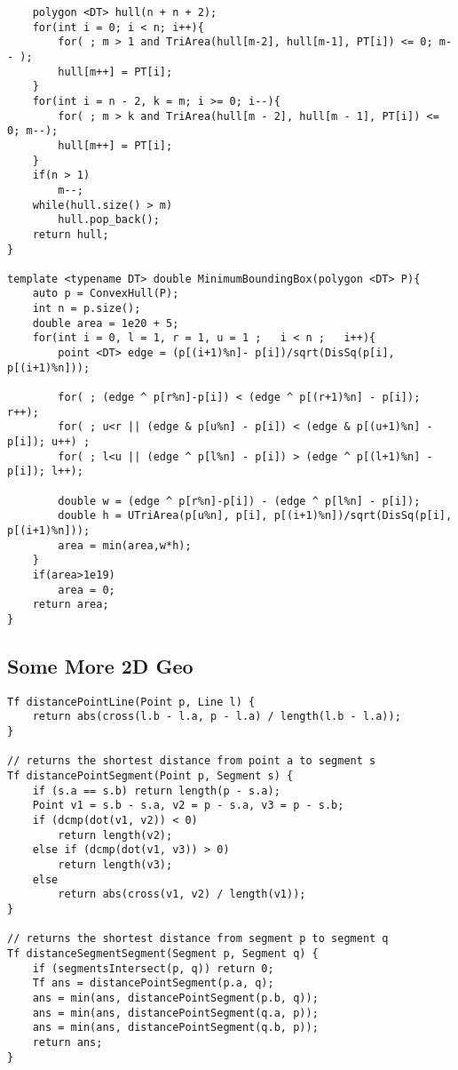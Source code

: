 \documentclass[10pt,a4paper,onesided]{article}
\begin{document}
\begin{multicols*}{3}
\begin{lstlisting}
    polygon <DT> hull(n + n + 2);
    for(int i = 0; i < n; i++){ 
        for( ; m > 1 and TriArea(hull[m-2], hull[m-1], PT[i]) <= 0; m-- );
        hull[m++] = PT[i];
    }
    for(int i = n - 2, k = m; i >= 0; i--){
        for( ; m > k and TriArea(hull[m - 2], hull[m - 1], PT[i]) <= 0; m--);
        hull[m++] = PT[i];
    }
    if(n > 1) 
        m--;
    while(hull.size() > m) 
        hull.pop_back();
    return hull;
}

template <typename DT> double MinimumBoundingBox(polygon <DT> P){
    auto p = ConvexHull(P);
    int n = p.size();
    double area = 1e20 + 5;
    for(int i = 0, l = 1, r = 1, u = 1 ;   i < n ;   i++){
        point <DT> edge = (p[(i+1)%n]- p[i])/sqrt(DisSq(p[i], p[(i+1)%n]));

        for( ; (edge ^ p[r%n]-p[i]) < (edge ^ p[(r+1)%n] - p[i]); r++); 
        for( ; u<r || (edge & p[u%n] - p[i]) < (edge & p[(u+1)%n] - p[i]); u++) ;
        for( ; l<u || (edge ^ p[l%n] - p[i]) > (edge ^ p[(l+1)%n] - p[i]); l++);
        
        double w = (edge ^ p[r%n]-p[i]) - (edge ^ p[l%n] - p[i]);
        double h = UTriArea(p[u%n], p[i], p[(i+1)%n])/sqrt(DisSq(p[i], p[(i+1)%n]));
        area = min(area,w*h);
    }
    if(area>1e19) 
        area = 0;
    return area;
}
\end{lstlisting}
\subsection{Some More 2D Geo}
\begin{lstlisting}
Tf distancePointLine(Point p, Line l) {
    return abs(cross(l.b - l.a, p - l.a) / length(l.b - l.a));
}

// returns the shortest distance from point a to segment s
Tf distancePointSegment(Point p, Segment s) {
    if (s.a == s.b) return length(p - s.a);
    Point v1 = s.b - s.a, v2 = p - s.a, v3 = p - s.b;
    if (dcmp(dot(v1, v2)) < 0)
        return length(v2);
    else if (dcmp(dot(v1, v3)) > 0)
        return length(v3);
    else
        return abs(cross(v1, v2) / length(v1));
}

// returns the shortest distance from segment p to segment q
Tf distanceSegmentSegment(Segment p, Segment q) {
    if (segmentsIntersect(p, q)) return 0;
    Tf ans = distancePointSegment(p.a, q);
    ans = min(ans, distancePointSegment(p.b, q));
    ans = min(ans, distancePointSegment(q.a, p));
    ans = min(ans, distancePointSegment(q.b, p));
    return ans;
}


\end{lstlisting}
\end{multicols*}
\end{document}
